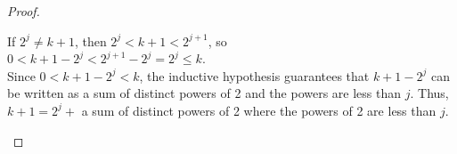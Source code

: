 \documentclass[answers]{exam}
\begin{document}
\begin{questions}
\begin{parts}
\begin{proof}
\begin{enumerate}[label=(\arabic{*})]
\begin{solution}
                  If $2^j\neq k+1$, then $2^j<k+1<2^{j+1}$, so\\

                  $0 < k+1-2^j<2^{j+1}-2^j=2^j\leq k$.\\

                  Since $0<k+1-2^j<k$, the inductive hypothesis guarantees that
                  $k+1-2^j$ can be written as a sum of distinct powers of 2 and
                  the powers are less than $j$. Thus, $k+1=2^j+$ a sum of
                  distinct powers of 2 where the powers of 2 are less than $j$.
                \end{solution}
            \end{enumerate}
          \end{proof}
      \end{parts}
  \end{questions}
\end{document}
